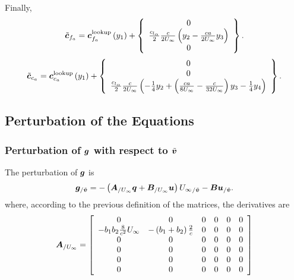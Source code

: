Finally,
\begin{equation}
	\tilde{\bm{c}}_{f_{a}} = 
		\bm{c}_{f_a}^\text{lookup}\left( y_1 \right) +
		\left\{ \begin{array}{c} 
			0 \\
			\frac{c_{l_\alpha}}{2} \frac{c}{2 U_\infty} \left(  y_2 - \frac{c a}{2 U_\infty} y_3 \right) \\ 
			0
		 \end{array} \right\}.
\end{equation}
\begin{equation}
	\tilde{\bm{c}}_{c_{a}} = 
		\bm{c}_{c_a}^\text{lookup}\left( y_1 \right) + \left\{
		\begin{array}{c}
		0 \\ 0\\
		\frac{c_{l_\alpha}}{2} \frac{c}{2 U_\infty}
		 \left(  -\frac{1}{4} y_2 +
		\left( \frac{ c a}{8 U_\infty} - \frac{c}{32 U_\infty}  \right) y_3 
		-\frac{1}{4} y_4 \right)
		\end{array}
		\right\}.
\end{equation}

\subsection{Perturbation of the Equations}

\subsubsection{Perturbation of $\bm{g}$ with respect to $\tilde{\bm{v}}$}
The perturbation of $\bm{g}$ is
\begin{equation}\label{eq:g_v}
\bm{g}_{/\tilde{\bm{v}}} = 
	-\left( \bm{A}_{/U_\infty} \bm{q}	+ \bm{B}_{/U_\infty} \bm{u} \right) 
	{U_\infty}_{/\tilde{\bm{v}}}
	-\bm{B} \bm{u}_{/\tilde{\bm{v}}}.
\end{equation}
where, according to the previous definition of the matrices,
the derivatives are
\begin{equation}
\bm{A}_{/U_\infty} = \left[
	\begin{array}{cccccc}
	0 & 0 & 0 & 0 & 0 & 0\\
	-b_1 b_2 \frac{8}{c^2} U_\infty & -\left( b_1 + b_2 \right) \frac{2}{c} & 0 & 0 & 0 & 0\\
	0 & 0 & 0 & 0 & 0 & 0\\
	0 & 0 & 0 & 0 & 0 & 0\\
	0 & 0 & 0 & 0 & 0 & 0\\
	0 & 0 & 0 & 0 & 0 & 0
	\end{array}
	\right]
\end{equation}
	
